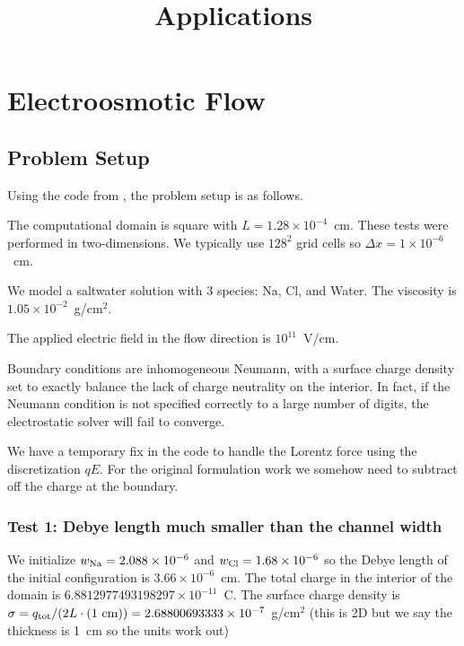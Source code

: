 \documentclass[final]{siamltex}
\begin{document}
\title{Applications}

\maketitle

\section{Electroosmotic Flow}

\subsection{Problem Setup}
Using the code from \cite{LowMachElectro}, the problem setup is as follows.

The computational domain is square with $L=1.28\times 10^{-4}$~cm.
These tests were performed in two-dimensions.  We typically use
$128^2$ grid cells so $\Delta x = 1\times 10^{-6}$~cm.

We model a saltwater solution with 3 species: Na, Cl, and Water.
The viscosity is $1.05\times 10^{-2}$~g/cm$^2$.

The applied electric field in the flow direction is $10^{11}$~V/cm.

Boundary conditions are inhomogeneous Neumann, with a surface charge
density set to exactly balance the lack of charge neutrality on the interior.
In fact, if the Neumann condition is not specified correctly to a large number
of digits, the electrostatic solver will fail to converge.

We have a temporary fix in the code to handle the Lorentz force using the
discretization $qE$.  For the original formulation work we somehow need to
subtract off the charge at the boundary.

\subsubsection{Test 1: Debye length much smaller than the channel width}
We initialize $w_{\rm Na} = 2.088\times 10^{-6}$ and
$w_{\rm Cl} = 1.68\times 10^{-6}$ so the Debye length of the initial
configuration is $3.66\times 10^{-6}$~cm.  The total charge in the interior
of the domain is $6.8812977493198297\times 10^{-11}$~C.  The surface charge density
is $\sigma = q_{\rm tot} / (2L\cdot (1~{\rm cm})) = 2.68800693333\times 10^{-7}$~g/cm$^2$
(this is 2D but we say the thickness is 1~cm so the units work out)
\end{document}
